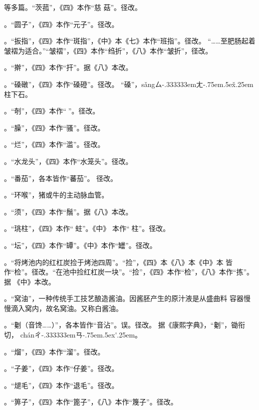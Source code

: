 \begin{list}{}
等多篇。“茨菰”，《四》本作“慈
菇”。径改。

。“圆子”，《四》本作“元子”。径改。

。“扳指”，《四》本作“斑指”，《中》本《七》本作“班指”。径改。
“……至肥肠起着皱褶为适合。”“皱褶”，《四》本作“绉折”，《八》本作“皱折”，径改。

。“擀”，《四》本作“扞”。据《八》本改。

。“磉礅”，《四》本作“磉磴”。径改。
“磉”，{s\v{a}ng}{ㄙ\kern-.333333emㄤ\kern-.75em\raise.5ex\hbox{\v{}}\kern.25em}
柱下石。

。“剞”，《四》本作“𠟤”。径改。

。“臊”，《四》本作“骚”。径改。

。“烂”，《四》本作“滥”。径改。

。“水龙头”，《四》本作“水笼头”。径改。

。“番茄”，各本皆作“蕃茄”。
径改。

。“环喉”，猪或牛的主动脉血管。

。“须”，《四》本作“鬚”。据《八》本改。

。“珧柱”，《四》本作“𧎼蛀”。《中》
本作“𧎼柱”。径改。

。“坛”，《四》本作“罈”。《中》本作“罎”。径改。

。“将烤池内的红杠炭捡于烤池四周”。“捡”，《四》本《八》本《中》本
皆作“检”。径改。“在池中捡红杠炭一块”。“捡”，《四》本作“检”，《八》本作“拣”。据
《中》本改。

。“窝油”，一种传统手工技艺酿造酱油。因酱胚产生的原汁液是从盛曲料
容器慢慢滴入窝内，故名窝油。又称白酱油。

。“劖（音馋……）”，各本皆作“音沾”。误。径改。
据《康熙字典》，“劖”，锄衔切，
{ch\'{a}n}{ㄔ\kern-.333333emㄢ\kern-.75em\raise.5ex\hbox{\'{}}\kern.25em}。

。“熘”，《四》本作“溜”。径改。

。“子姜”，《四》本作“仔姜”。径改。

。“煺毛”，《四》本作“退毛”。径改。

。“箅子”，《四》本作“篦子”，《八》本作“篾子”。径改。


\end{list}
